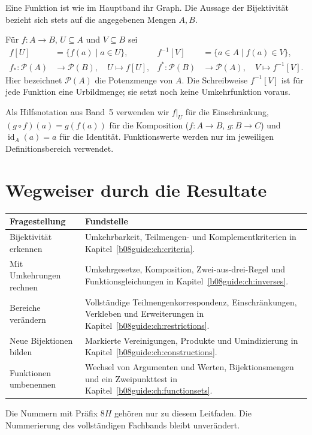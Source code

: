 Eine Funktion ist wie im Hauptband ihr Graph. Die Aussage der
Bijektivität bezieht sich stets auf die angegebenen Mengen $A,B$.

\begin{definition}
\label{b08guide:def:notation}
Für $f\colon A\to B$, $U\subseteq A$ und $V\subseteq B$ sei
\[
 \begin{aligned}
 f[U]&=\{f(a)\mid a\in U\},&
 f^{-1}[V]&=\{a\in A\mid f(a)\in V\},\\
 f_*\colon\mathcal P(A)&\to\mathcal P(B),\quad U\mapsto f[U],&
 f^*\colon\mathcal P(B)&\to\mathcal P(A),\quad V\mapsto f^{-1}[V].
 \end{aligned}
\]
Hier bezeichnet $\mathcal P(A)$ die Potenzmenge von $A$.
Die Schreibweise $f^{-1}[V]$ ist für jede Funktion eine Urbildmenge;
sie setzt noch keine Umkehrfunktion voraus.
\end{definition}

Als Hilfsnotation aus Band~5 verwenden wir $f|_U$ für die
Einschränkung, $(g\circ f)(a)=g(f(a))$ für die Komposition
($f\colon A\to B$, $g\colon B\to C$) und
$\operatorname{id}_A(a)=a$ für die Identität. Funktionswerte
werden nur im jeweiligen Definitionsbereich verwendet.

\section{Wegweiser durch die Resultate}

\begin{center}
\begin{tabularx}{\textwidth}{@{}p{}X@{}}
\toprule
Fragestellung & Fundstelle\\
\midrule
Bijektivität erkennen &
Umkehrbarkeit, Teilmengen- und Komplementkriterien
in Kapitel~\ref{b08guide:ch:criteria}.\\
Mit Umkehrungen rechnen &
Umkehrgesetze, Komposition, Zwei-aus-drei-Regel und
Funktionsgleichungen in Kapitel~\ref{b08guide:ch:inverses}.\\
Bereiche verändern &
Vollständige Teilmengenkorrespondenz, Einschränkungen,
Verkleben und Erweiterungen in Kapitel~\ref{b08guide:ch:restrictions}.\\
Neue Bijektionen bilden &
Markierte Vereinigungen, Produkte und Umindizierung
in Kapitel~\ref{b08guide:ch:constructions}.\\
Funktionen umbenennen &
Wechsel von Argumenten und Werten, Bijektionsmengen
und ein Zweipunkttest in Kapitel~\ref{b08guide:ch:functionsets}.\\
\bottomrule
\end{tabularx}
\end{center}

Die Nummern mit Präfix $8H$ gehören nur zu diesem Leitfaden.
Die Nummerierung des vollständigen Fachbands bleibt unverändert.
